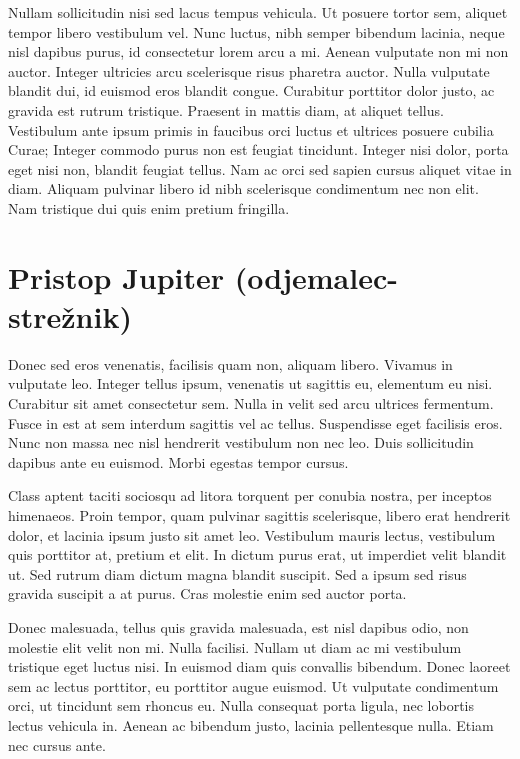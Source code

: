 \documentclass[a4paper, 12pt, twoside]{book}
\begin{document}
Nullam sollicitudin nisi sed lacus tempus vehicula. Ut posuere tortor sem, aliquet tempor libero vestibulum vel. Nunc luctus, nibh semper bibendum lacinia, neque nisl dapibus purus, id consectetur lorem arcu a mi. Aenean vulputate non mi non auctor. Integer ultricies arcu scelerisque risus pharetra auctor. Nulla vulputate blandit dui, id euismod eros blandit congue. Curabitur porttitor dolor justo, ac gravida est rutrum tristique. Praesent in mattis diam, at aliquet tellus. Vestibulum ante ipsum primis in faucibus orci luctus et ultrices posuere cubilia Curae; Integer commodo purus non est feugiat tincidunt. Integer nisi dolor, porta eget nisi non, blandit feugiat tellus. Nam ac orci sed sapien cursus aliquet vitae in diam. Aliquam pulvinar libero id nibh scelerisque condimentum nec non elit. Nam tristique dui quis enim pretium fringilla.

\section{Pristop Jupiter (odjemalec-strežnik)}

Donec sed eros venenatis, facilisis quam non, aliquam libero. Vivamus in vulputate leo. Integer tellus ipsum, venenatis ut sagittis eu, elementum eu nisi. Curabitur sit amet consectetur sem. Nulla in velit sed arcu ultrices fermentum. Fusce in est at sem interdum sagittis vel ac tellus. Suspendisse eget facilisis eros. Nunc non massa nec nisl hendrerit vestibulum non nec leo. Duis sollicitudin dapibus ante eu euismod. Morbi egestas tempor cursus.

Class aptent taciti sociosqu ad litora torquent per conubia nostra, per inceptos himenaeos. Proin tempor, quam pulvinar sagittis scelerisque, libero erat hendrerit dolor, et lacinia ipsum justo sit amet leo. Vestibulum mauris lectus, vestibulum quis porttitor at, pretium et elit. In dictum purus erat, ut imperdiet velit blandit ut. Sed rutrum diam dictum magna blandit suscipit. Sed a ipsum sed risus gravida suscipit a at purus. Cras molestie enim sed auctor porta.

Donec malesuada, tellus quis gravida malesuada, est nisl dapibus odio, non molestie elit velit non mi. Nulla facilisi. Nullam ut diam ac mi vestibulum tristique eget luctus nisi. In euismod diam quis convallis bibendum. Donec laoreet sem ac lectus porttitor, eu porttitor augue euismod. Ut vulputate condimentum orci, ut tincidunt sem rhoncus eu. Nulla consequat porta ligula, nec lobortis lectus vehicula in. Aenean ac bibendum justo, lacinia pellentesque nulla. Etiam nec cursus ante.
\end{document}
